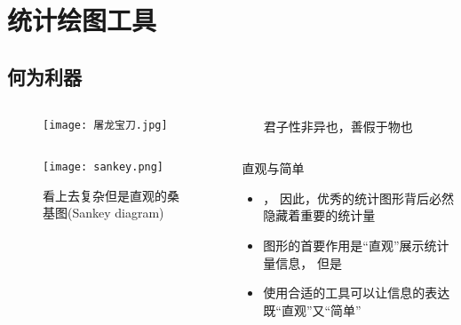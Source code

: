 
\section{统计绘图工具}
\subsection{何为利器}
\begin{frame}{\subsecname}{}

  \begin{columns}
    \begin{column}{.5\textwidth}
      \begin{figure}
        \centering \texttt{[image: 屠龙宝刀.jpg]}
      \end{figure}
    \end{column}

    \begin{column}{.48\textwidth}
      \begin{ornamentblock}
        \centering
        {君子性非异也，善假于物也\\ %
          }
      \end{ornamentblock}
    \end{column}
  \end{columns}

\end{frame}

\begin{frame}[c]{\subsecname}
  
  \begin{columns}
    \begin{column}{.5\textwidth}
      \begin{figure}
        \centering \texttt{[image: sankey.png]}
        \caption{看上去复杂但是直观的桑基图(Sankey diagram)}
      \end{figure}
    \end{column}

    \begin{column}{.5\textwidth}
      \begin{block}{\small 直观与简单} \small
        \begin{itemize}
        \item[\HandRight] ，
        因此，优秀的统计图形背后必然隐藏着重要的统计量
        \item[\HandRight] 图形的首要作用是“直观”展示统计量信息，
        但是
        \item[\HandRight] 使用合适的工具可以让信息的表达既“直观”又“简单” 
        \end{itemize}
      \end{block}
    \end{column}
  \end{columns}
    
\end{frame}

